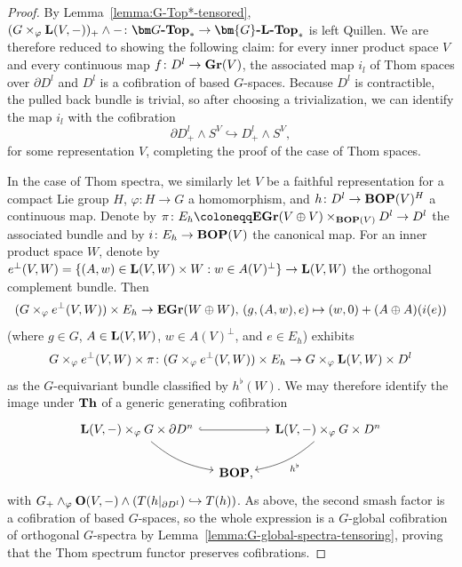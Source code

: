 \documentclass[reqno]{memo-l}
\theoremstyle{mythm}
\theoremstyle{definition}
\numberwithin{equation}{section}
\renewcommand{\phi}{\varphi}
\newcommand{\cat}[1]{\textbf{\textup{#1}}}
\newcommand{\dual}{\flat}
\let\smashp=\wedge
\newcommand{\Gospc}[1]{\cat{$\bm{#1}$-$\cat{L}$-Top}}
\newcommand{\BOP}{\cat{BOP}}
\newcommand{\Gr}{\cat{Gr}}
\newcommand{\eGr}{\cat{EGr}}
\begin{document}
\begin{proof}
  By Lemma~\ref{lemma:G-Top*-tensored}, $(G\times_{\phi}\cat L(V,-))_{+}\smashp {-}\colon \cat{$\bm G$-Top}_*\to \Gospc{G}_*$ is left Quillen.
  We are therefore reduced to showing the following claim: for every inner product space $V$ and every continuous map $f\colon D^l\to\Gr(V)$, the associated map $i_l$ of Thom spaces
  over $\partial D^l$ and $D^l$ is a cofibration of based $G$-spaces.
  Because $D^l$ is contractible, the pulled back bundle is trivial, so
  after choosing a trivialization, we can identify the map $i_l$ with the cofibration
  \[ \partial D^l_{+}\smashp S^V\hookrightarrow D^l_{+}\smashp S^V ,\]
  for some representation $V$, completing the proof of the case of Thom spaces.

  In the case of Thom spectra, we similarly let $V$ be a faithful representation for a compact Lie group $H$, $\phi\colon H\to G$ a homomorphism, and $h\colon D^l\to \BOP(V)^H$ a continuous map. Denote by $\pi\colon E_h\coloneqq \eGr(V\oplus V)\times_{\BOP(V)}D^l\to D^l$ the associated bundle and by $i\colon E_h\to \BOP(V)$ the canonical map. 
  For an inner product space $W$, denote by $e^{\perp}(V,W)=\{ (A,w)\in\cat L(V,W)\times W : w\in A(V)^{\perp}\}\to \cat L(V,W)$ the orthogonal complement bundle. 
  Then \[(G\times_{\phi}e^{\perp}(V,W))\times E_h\to \eGr(W\oplus W), \, (g,(A,w),e)\mapsto (w,0)+(A\oplus A)(i(e))\] 
  (where $g\in G$, $A\in\cat L(V,W)$, $w\in A(V)^{\perp}$, and $e\in E_h$)
  exhibits \[G\times_{\phi}e^{\perp}(V,W)\times \pi\colon (G\times_{\phi}e^{\perp}(V,W))\times E_h\to G\times_{\phi}\cat L(V,W)\times D^l\] as the $G$-equivariant bundle classified by $h^{\dual}(W)$. We may therefore identify the image under $\cat{Th}$ of a generic generating cofibration
  \[
    \begin{tikzcd}[column sep=small]
            \cat L(V,-)\times_{\phi}G\times \partial D^n\arrow[dr,bend right=15pt]\arrow[rr,hook] && \cat L(V,-)\times_{\phi}G\times D^n\arrow[dl,bend left=15pt,"h^\dual"]\\
            & \cat{BOP}\rlap,
        \end{tikzcd}
  \]
  with $G_{+}\smashp_{\phi}\cat O(V,-)\smashp (T(h|_{\partial D^l})\hookrightarrow T(h))$. As above, the second smash factor is a cofibration of based $G$-spaces, so the whole expression is a $G$-global cofibration of orthogonal $G$-spectra by Lemma~\ref{lemma:G-global-spectra-tensoring}, proving that the Thom spectrum functor preserves cofibrations. 
\end{proof}
\end{document}
